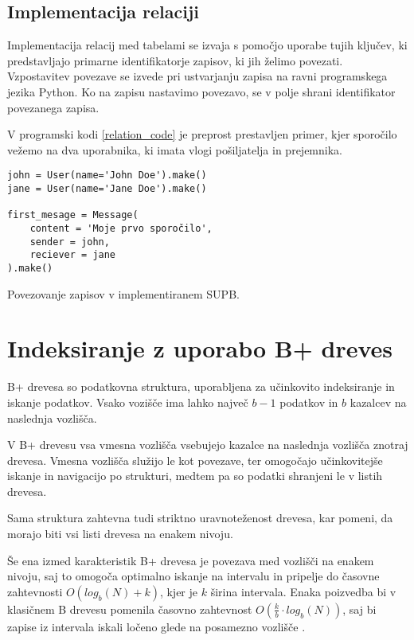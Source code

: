 \documentclass[a4paper,12pt,openright]{book}
\begin{document}
        \subsection{Implementacija relaciji}

        Implementacija relacij med tabelami se izvaja s pomočjo uporabe tujih ključev, ki predstavljajo primarne identifikatorje zapisov, ki jih želimo povezati. Vzpostavitev povezave se izvede pri ustvarjanju zapisa na ravni programskega jezika Python. Ko na zapisu nastavimo povezavo, se v polje shrani identifikator povezanega zapisa.

        V programski kodi \ref{relation_code} je preprost prestavljen primer, kjer sporočilo vežemo na dva uporabnika, ki imata vlogi pošiljatelja in prejemnika.

\begin{code}
\begin{verbatim}
john = User(name='John Doe').make()
jane = User(name='Jane Doe').make()

first_mesage = Message(
    content = 'Moje prvo sporočilo',
    sender = john,
    reciever = jane
).make()
\end{verbatim}
\caption{Povezovanje zapisov v implementiranem SUPB.}
\label{relation_code}
\end{code}

    \section{Indeksiranje z uporabo B+ dreves}

        B+ drevesa so podatkovna struktura, uporabljena za učinkovito indeksiranje in iskanje podatkov. Vsako vozišče ima lahko največ $b - 1$ podatkov in $b$ kazalcev na naslednja vozlišča.

        V B+ drevesu vsa vmesna vozlišča vsebujejo kazalce na naslednja vozlišča znotraj drevesa. Vmesna vozlišča služijo le kot povezave, ter omogočajo učinkovitejše iskanje in navigacijo po strukturi, medtem pa so podatki shranjeni le v listih drevesa.

        Sama struktura zahtevna tudi striktno uravnoteženost drevesa, kar pomeni, da morajo biti vsi listi drevesa na enakem nivoju.

        Še ena izmed karakteristik B+ drevesa je povezava med vozlišči na enakem nivoju, saj to omogoča optimalno iskanje na intervalu in pripelje do časovne zahtevnosti $O(log_b(N) + k)$, kjer je $k$ širina intervala. Enaka poizvedba bi v klasičnem B drevesu pomenila časovno zahtevnost $O(\frac{k}{b} \cdot log_b(N))$, saj bi zapise iz intervala iskali ločeno glede na posamezno vozlišče \cite{BPTREE}.
\end{document}
